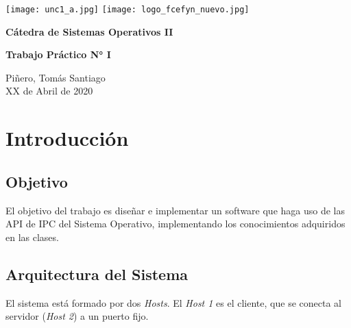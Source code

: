 \documentclass[12pt,a4paper]{article}
\renewcommand{\baselinestretch}{1} %
\begin{document}
\begin{titlepage}
    \begin{center}
      \vspace*{1cm}

      \vspace{2cm}
      \texttt{[image: unc1\_a.jpg]}
      \texttt{[image: logo\_fcefyn\_nuevo.jpg]}

      \Huge
      \textbf{Cátedra de Sistemas Operativos II}

      \vspace{3.5cm}

      \textbf{Trabajo Práctico N\si{\degree} I}

      \vfill

      \vspace{0.8cm}



      \Large
      Piñero, Tomás Santiago\\
      XX de Abril de 2020
    \end{center}
\end{titlepage}

\setcounter{secnumdepth}{1}
\setcounter{tocdepth}{5}
\tableofcontents


\newpage
\renewcommand{\baselinestretch}{1}
\setlength{\parskip}{0.5em}

\section{Introducción}
\label{intro}

\subsection{Objetivo}
\label{objetivo}
El objetivo del trabajo es diseñar e implementar un software que haga uso de las
API de IPC del Sistema Operativo, implementando los conocimientos adquiridos en
las clases.

\subsection{Arquitectura del Sistema}
\label{sistema}
El sistema está formado por dos \emph{Hosts}. El \emph{Host 1} es el cliente,
que se conecta al servidor (\emph{Host 2}) a un puerto fijo.
\end{document}

